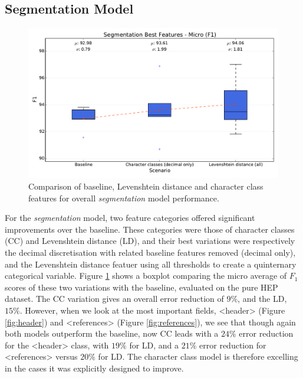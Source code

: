 \subsection{Segmentation Model}

\begin{figure}[h]
\center
\includegraphics[width=5.5in]{Figures/micro_segmentation.pdf}
\caption{Comparison of baseline, Levenshtein distance and character class features for overall \emph{segmentation} model performance.}
\label{fig:micro_segmentation}
\end{figure}

For the \emph{segmentation} model, two feature categories offered significant improvements over the baseline. These categories were those of character classes (CC) and Levenshtein distance (LD), and their best variations were respectively the decimal discretisation with related baseline features removed (decimal only), and the Levenshtein distance featuer using all thresholds to create a quinternary categorical variable. Figure \ref{fig:micro_segmentation} shows a boxplot comparing the micro average of $F_1$ scores of these two variations with the baseline, evaluated on the pure HEP dataset. The CC variation gives an overall error reduction of $9\%$, and the LD, $15\%$. However, when we look at the most important fields, <header> (Figure \ref{fig:header}) and <references> (Figure \ref{fig:references}), we see that though again both models outperform the baseline, now CC leads with a $24\%$ error reduction for the <header> class, with $19\%$ for LD, and a $21\%$ error reduction for <references> versus $20\%$ for LD. The character class model is therefore excelling in the cases it was explicitly designed to improve.

